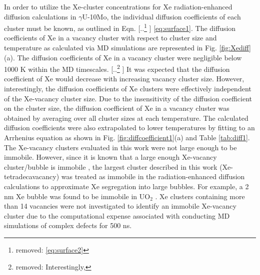 \documentclass[preprint,12pt]{elsarticle}
\providecommand{\DIFadd}[1]{{\protect\color{blue} \sf #1}} %
\providecommand{\DIFdel}[1]{{\protect\color{red} [..\footnote{removed: #1} ]}} %
\providecommand{\DIFaddbegin}{} %
\providecommand{\DIFaddend}{} %
\providecommand{\DIFdelbegin}{} %
\providecommand{\DIFdelend}{} %
\newcommand{\DIFscaledelfig}{0.5}
\newlength{\DIFdelgraphicswidth} %
\newlength{\DIFdelgraphicsheight} %
\newcommand{\DIFaddincludegraphics}[2][]{{\color{blue}\fbox{\DIFOincludegraphics[#1]{#2}}}} %
\newcommand{\DIFdelincludegraphics}[2][]{%
\sbox{\DIFdelgraphicsbox}{\DIFOincludegraphics[#1]{#2}}%
\settoboxwidth{\DIFdelgraphicswidth}{\DIFdelgraphicsbox} %
\settoboxtotalheight{\DIFdelgraphicsheight}{\DIFdelgraphicsbox} %
\scalebox{\DIFscaledelfig}{%
\parbox[b]{\DIFdelgraphicswidth}{\usebox{\DIFdelgraphicsbox}\\[-\baselineskip] \rule{\DIFdelgraphicswidth}{0em}}\llap{\resizebox{\DIFdelgraphicswidth}{\DIFdelgraphicsheight}{%
\setlength{\unitlength}{\DIFdelgraphicswidth}%
\begin{picture}(1,1)%
\thicklines\linethickness{2pt} %
{\color[rgb]{1,0,0}\put(0,0){\framebox(1,1){}}}%
{\color[rgb]{1,0,0}\put(0,0){\line( 1,1){1}}}%
{\color[rgb]{1,0,0}\put(0,1){\line(1,-1){1}}}%
\end{picture}%
}\hspace*{3pt}}} %
} %
\DeclareRobustCommand{\DIFaddbegin}{\DIFOaddbegin \let\includegraphics\DIFaddincludegraphics} %
\DeclareRobustCommand{\DIFaddend}{\DIFOaddend \let\includegraphics\DIFOincludegraphics} %
\DeclareRobustCommand{\DIFdelbegin}{\DIFOdelbegin \let\includegraphics\DIFdelincludegraphics} %
\DeclareRobustCommand{\DIFdelend}{\DIFOaddend \let\includegraphics\DIFOincludegraphics} %
\begin{document}
\indent In order to utilize the Xe-cluster concentrations for Xe radiation-enhanced diffusion calculations in $\gamma$U-10Mo, the individual diffusion coefficients of each cluster must be known, as outlined in Eqn. \DIFdelbegin \DIFdel{\ref{eq:surface2}}\DIFdelend \DIFaddbegin \DIFadd{\ref{eq:surface1}}\DIFaddend . The diffusion coefficients of Xe in a vacancy cluster with respect to cluster size and temperature as calculated via MD \DIFaddbegin \DIFadd{simulations }\DIFaddend are represented in Fig. \ref{fig:Xediff}(a). The diffusion coefficients of Xe in a vacancy cluster were negligible below 1000 K within the MD timescales. \DIFdelbegin \DIFdel{Interestingly, }\DIFdelend \DIFaddbegin \DIFadd{It was expected that the diffusion coefficient of Xe would decrease with increasing vacancy cluster size. However, interestingly, }\DIFaddend the diffusion coefficients of Xe clusters were effectively independent of the Xe-vacancy cluster size. Due to the insensitivity \DIFaddbegin \DIFadd{of the diffusion coefficient }\DIFaddend on the cluster size, the diffusion coefficient of Xe in a vacancy cluster was obtained by averaging over all cluster sizes at each temperature. The calculated diffusion coefficients were also extrapolated to lower temperatures by fitting to an Arrhenius equation as shown in Fig. \ref{fig:diffcoefficient1}(a) and Table \ref{tab:diff1}. \DIFdelbegin %
\DIFdelend \DIFaddbegin \DIFadd{The Xe-vacancy clusters evaluated in this work were not large enough to be immobile. However, since it is known that a large enough Xe-vacancy cluster/bubble is immobile \cite{baker1977migration, kim2022modeling}, the largest cluster described in this work (Xe-tetradecavacancy) was treated as immobile in the radiation-enhanced diffusion calculations to approximate Xe segregation into large bubbles. For example, a 2 nm Xe bubble was found to be immobile in UO$_{2}$ \cite{baker1977migration}. Xe clusters containing more than 14 vacancies were not investigated to identify an immobile Xe-vacancy cluster due to the computational expense associated with conducting MD simulations of complex defects for 500 ns.
}
\end{document}
